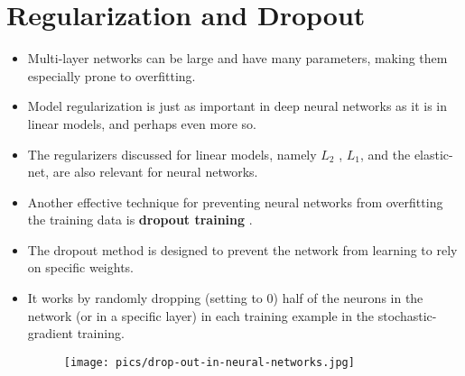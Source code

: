 \section{Regularization and Dropout}
\begin{itemize}
\item Multi-layer networks can be large and have many parameters, making them especially prone to overfitting.

\item Model regularization is just as important in deep neural networks as it is in linear models, and perhaps even more so.

\item The regularizers discussed for linear models, namely $L_2$ , $L_1$, and the elastic-net, are also relevant for neural networks.

\item Another effective technique for preventing neural networks from overfitting the training data is \textbf{dropout training} \cite{srivastava2014dropout}.

\item The dropout method is designed to prevent the network from learning to rely on specific weights.

\item It works by randomly dropping (setting to 0) half of the neurons in the network (or in a specific layer) in each training example in the stochastic-gradient training.


 \begin{figure}[htb]
	\centering
	 \texttt{[image: pics/drop-out-in-neural-networks.jpg]}
\end{figure}


\end{itemize}




